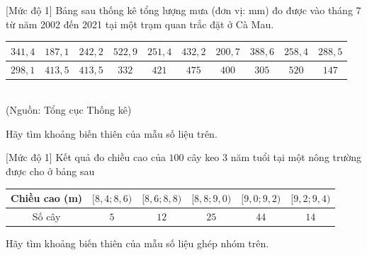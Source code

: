 \begin{bt}%
[Mức độ 1]
	Bảng sau thống kê tổng lượng mưa (đơn vị: mm) đo được vào tháng 7 từ năm 2002 đến 2021 tại một trạm quan trắc đặt ở Cà Mau.
	\begin{center}
		\begin{tabular}{|c|c|c|c|c|c|c|c|c|c|}
			\hline
			$341{,}4$ & $187{,}1$ & $242{,}2$ & $522{,}9$ & $251{,}4$ & $432{,}2$ & $200{,}7$ & $388{,}6$ & $258{,}4$ & $288{,}5$ \\
			\hline
			$298{,}1$ & $413{,}5$ & $413{,}5$ & $332$ & $421$ & $475$ & $400$ & $305$ & $520$ & $147$ \\
			\hline
		\end{tabular}\\
		(Nguồn: Tổng cục Thống kê)
	\end{center}
	Hãy tìm khoảng biến thiên của mẫu số liệu trên.
\end{bt}

\begin{bt}%
[Mức độ 1]
	Kết quả đo chiều cao của $100$ cây keo 3 năm tuổi tại một nông trường được cho ở bảng sau
	\begin{center}
		\begin{tabular}{|c|c|c|c|c|c|}
			\hline
			Chiều cao (m) & $[8{,}4;8{,}6)$ & $[8{,}6;8{,}8)$ & $[8{,}8;9{,}0)$ & $[9{,}0;9{,}2)$ & $[9{,}2;9{,}4)$ \\
			\hline
			Số cây & $5$ & $12$ & $25$ & $44$ & $14$ \\
			\hline
		\end{tabular}
	\end{center}
	Hãy tìm khoảng biến thiên của mẫu số liệu ghép nhóm trên.
\end{bt}

